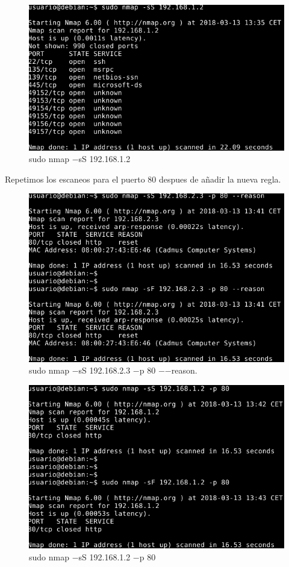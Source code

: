 \documentclass[11pt]{article}
\begin{document}
      \begin{figure}[H]
        \centering
        \includegraphics[width = .9\textwidth]{sondeo6}
        \caption{sudo nmap $-$sS 192.168.1.2}
      \end{figure}

      \par
      Repetimos los escaneos para el puerto 80 despues de añadir la nueva regla.

      \begin{figure}[H]
        \centering
        \includegraphics[width = .9\textwidth]{sondeo8}
        \caption{sudo nmap $-$sS 192.168.2.3 $-$p 80 $-$$-$reason.}
      \end{figure}

      \begin{figure}[H]
        \centering
        \includegraphics[width = .9\textwidth]{sondeo9}
        \caption{sudo nmap $-$sS 192.168.1.2 $-$p 80}
      \end{figure}
\end{document}
